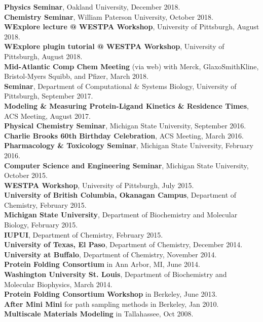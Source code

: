 \documentclass[margin,line]{res}
\begin{document}
\begin{resume}
{\bf Physics Seminar}, Oakland University, December 2018.\\
{\bf Chemistry Seminar}, William Paterson University, October 2018.\\
{\bf WExplore lecture @ WESTPA Workshop}, University of Pittsburgh, August 2018.\\
{\bf WExplore plugin tutorial @ WESTPA Workshop}, University of Pittsburgh, August 2018.\\
{\bf Mid-Atlantic Comp Chem Meeting} (via web) with Merck, GlaxoSmithKline, Bristol-Myers Squibb, and Pfizer, March 2018. \\
{\bf Seminar}, Department of Computational \& Systems Biology, University of Pittsburgh, September 2017. \\
{\bf Modeling \& Measuring Protein-Ligand Kinetics \& Residence Times}, ACS Meeting, August 2017. \\
{\bf Physical Chemistry Seminar}, Michigan State University, September 2016. \\
{\bf Charlie Brooks 60th Birthday Celebration}, ACS Meeting, March 2016. \\
{\bf Pharmacology \& Toxicology Seminar}, Michigan State University, February 2016. \\
{\bf Computer Science and Engineering Seminar}, Michigan State University, October 2015. \\
{\bf WESTPA Workshop}, University of Pittsburgh, July 2015. \\
{\bf University of British Columbia, Okanagan Campus}, Department of Chemistry, February 2015. \\
{\bf Michigan State University}, Department of Biochemistry and Molecular Biology, February 2015. \\
{\bf IUPUI}, Department of Chemistry, February 2015. \\
{\bf University of Texas, El Paso}, Department of Chemistry, December 2014. \\
{\bf University at Buffalo}, Department of Chemistry, November 2014. \\
{\bf Protein Folding Consortium} in Ann Arbor, MI, June 2014. \\
{\bf Washington University St. Louis}, Department of Biochemistry and Molecular Biophysics, March 2014. \\
{\bf Protein Folding Consortium Workshop} in Berkeley, June 2013. \\
{\bf After Mini Mini} for path sampling methods in Berkeley, Jan 2010. \\
{\bf Multiscale Materials Modeling} in Tallahassee, Oct 2008. \\


\end{resume}
\end{document}
